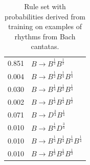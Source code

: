 \documentclass{article}
\begin{document}
\begin{table}
\centering
\begin{tabular}{ll}
0.851 & $B \rightarrow B^\frac{1}{2} B^\frac{1}{2}$\\
0.004 & $B \rightarrow B^\frac{1}{2} B^\frac{1}{4} B^\frac{1}{4}$\\
0.030 & $B \rightarrow B^\frac{1}{4} B^\frac{1}{2} B^\frac{1}{4}$\\ 
0.002 & $B \rightarrow B^\frac{1}{4} B^\frac{1}{4} B^\frac{1}{2}$\\ 
0.071 & $B \rightarrow D^\frac{3}{4} B^\frac{1}{4}$\\
0.010 & $B \rightarrow B^\frac{1}{4} D^\frac{3}{4}$\\
0.010 & $B \rightarrow B^\frac{1}{4} B^\frac{1}{4} B^\frac{1}{4} B^\frac{1}{4}$\\
0.010 & $B \rightarrow B^\frac{1}{3} B^\frac{1}{3} B^\frac{1}{3}$\\ 
\end{tabular}
\caption{Rule set with probabilities derived from training on examples of rhythms from Bach cantatas.}\label{simplerules}
\end{table}
\end{document}
